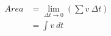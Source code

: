 \documentclass[preview]{standalone}
\begin{document}
\begin{align*}
Area&=\lim_{\Delta t\to 0} (\sum v \ \Delta t ) \\ &=\int v \ dt
\end{align*}
\end{document}
